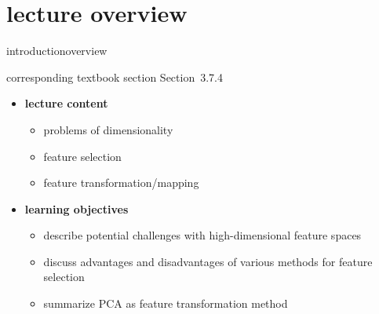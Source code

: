 

\subtitle{Module 3.7.4: Feature Dimensionality Reduction}


	

    \section[overview]{lecture overview}
        \begin{frame}{introduction}{overview}
            \begin{block}{corresponding textbook section}
                    Section~3.7.4
            \end{block}

            \begin{itemize}
                \item   \textbf{lecture content}
                    \begin{itemize}
                        \item   problems of dimensionality
                        \item   feature selection
                        \item   feature transformation/mapping
                    \end{itemize}
                \bigskip
                \item<2->   \textbf{learning objectives}
                    \begin{itemize}
                        \item   describe potential challenges with high-dimensional feature spaces
                        \item   discuss advantages and disadvantages of various methods for feature selection
                        \item   summarize PCA as feature transformation method
                    \end{itemize}
            \end{itemize}
        \end{frame}

